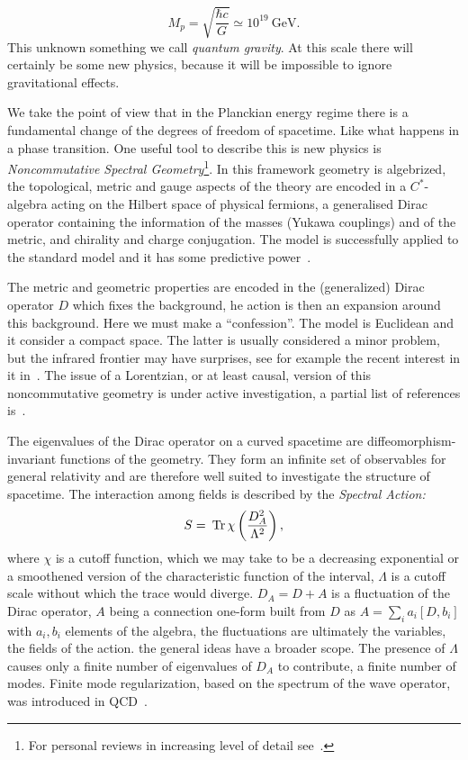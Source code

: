 \documentclass[12pt,a4paper]{article}
\newcommand{\be}{\begin{equation}}
\newcommand{\ee}{\end{equation}}
\newcommand{\Tr}[1]{\:{\rm Tr}\,#1}
\begin{document}
\be
M_p=\sqrt{\frac{\hbar c}G}\simeq
10^{19}~\mathrm{GeV}.
\ee
 This unknown something we call \emph{quantum gravity}. At this scale there will certainly be some new physics, because it will be impossible to ignore gravitational effects.

We take the point of view that in the Planckian energy regime there is a fundamental change of the degrees of freedom of spacetime. Like what happens in a phase transition. One useful tool to describe this is new physics is \emph{Noncommutative Spectral Geometry}\footnote{For personal reviews in increasing level of detail see~\cite{Vilasiproc, Corfuproc, DevastatoLizziKurkov}.}. In this framework geometry is algebrized, the topological, metric and gauge aspects of the theory are encoded in a $C^*$-algebra acting on the Hilbert space of physical fermions, a generalised Dirac operator containing the information of the masses (Yukawa couplings) and of the metric, and chirality and charge conjugation. The model is successfully applied to the standard model and it has some predictive power~\cite{AC2M2, ColdPlay, CCvS, Grandproc, Aydemir:2015nfa, Walterbook}.


The metric and geometric properties are encoded in the (generalized) Dirac operator $D$ which fixes the background, he action is then an expansion around this background. Here we must make a ``confession''. The model is Euclidean and it consider a compact space. The latter is usually considered a minor problem, but the infrared frontier may have surprises, see for example the recent interest in it in~\cite{Strominger, eomconstraints, scent}. The issue of a Lorentzian, or at least causal, version of this noncommutative geometry is under active investigation, a partial list of references is~\cite{Dungen:2015pca, Bizi:2016lbv, Franco:2012er, Franco:2013gxa, Franco:2015qra, DAndrea:2016hyl, Kurkov:2017wmx, Devastato:2017rlo, Bochniak:2018ucd, Aydemir:2019txw}.


The eigenvalues of the Dirac operator on a curved spacetime are diffeomorphism-invariant functions
of the geometry. They form an infinite set of observables for general relativity and are therefore well suited to investigate the structure of spacetime. The interaction among fields is described by the \emph{Spectral Action:}
\be
S=\Tr\chi\left(\frac{D_A^2}{\Lambda^2}\right), \label{bosonicspectralact}
\ee
where $\chi$ is a cutoff function, which we may take to be a decreasing exponential or a smoothened version of the characteristic function of the interval, $\Lambda$ is a cutoff scale without which the trace would diverge. $D_A=D+A$ is a fluctuation of the Dirac operator, $A$ being a connection one-form built from $D$ as $A=\sum_i a_i[D,b_i]$ with $a_i,b_i$ elements of the algebra, the fluctuations are ultimately the variables, the fields of the action. the general ideas have a broader scope.  The presence of $\Lambda$ causes only a finite number of eigenvalues of $D_A$ to contribute, a finite number of modes. Finite mode regularization, based on the spectrum of the wave operator, was introduced in QCD~\cite{AndrianovBonora1, AndrianovBonora2, Fujikawabook}.
\end{document}
